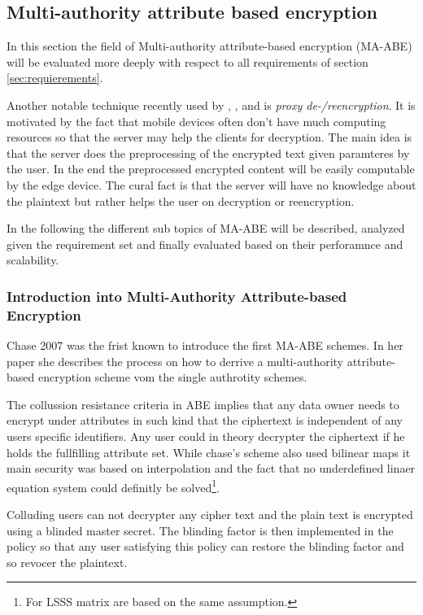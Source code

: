 \subsection{Multi-authority attribute based encryption}
In this section the field of Multi-authority attribute-based encryption (\ac{MA-ABE}) will be evaluated more deeply with respect to all requirements of section \ref{sec:requierements}. 

Another notable technique recently used by \cite{yang2013dac}, \cite{wu2017security}, \cite{li2017two} and \cite{wang2011hierarchical} is \textit{proxy de-/reencryption}. It is motivated by the fact that mobile devices often don't have much computing resources so that the server may help the clients for decryption. The main idea is that the server does the preprocessing of the encrypted text given paramteres by the user. In the end the preprocessed encrypted content will be easily computable by the edge device. The cural fact is that the server will have no knowledge about the plaintext but rather helps the user on decryption or reencryption. 

In the following the different sub topics of \ac{MA-ABE} will be described, analyzed given the requirement set and finally evaluated based on their perforamnce and scalability. 

\subsubsection{Introduction into Multi-Authority Attribute-based Encryption}
Chase 2007 \cite{chase2007multi} was the frist known to introduce the first \ac{MA-ABE} schemes. In her paper she describes the process on how to derrive a multi-authority attribute-based encryption scheme vom the single authrotity schemes. 

The collussion resistance criteria in \ac{ABE} implies that any data owner needs to encrypt under attributes in such kind that the ciphertext is independent of any users specific identifiers. Any user could in theory decrypter the ciphertext if he holds the fullfilling attribute set. While chase's scheme also used bilinear maps it main security was based on interpolation and the fact that no underdefined linaer equation system could definitly be solved\footnote{For \ac{LSSS} matrix are based on the same assumption.}.  

Colluding users can not decrypter any cipher text and the plain text is encrypted using a blinded master secret. The blinding factor is then implemented in the policy so that any user satisfying this policy can restore the blinding factor and so revocer the plaintext. 

